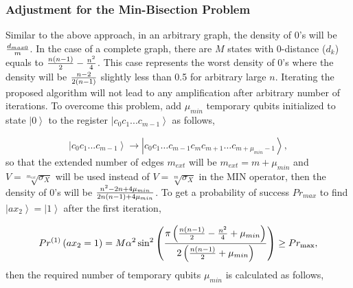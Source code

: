 \documentclass[a4paper]{article}
\begin{document}
\subsubsection*{Adjustment for the Min-Bisection Problem}


Similar to the above approach, in an arbitrary graph, the density of 0's will be ${\textstyle{{d_{max0} } \over m}}$. 
In the case of a complete graph, there are $M$ states with 0-distance ($d_k$) equals to 
${\textstyle{{n(n - 1)} \over 2}}-{\textstyle{{n^2} \over 4}}$. 
This case represents the worst density of 0's where the density will be ${\textstyle{{n-2 } \over {2(n - 1)}}}$ 
slightly less than 0.5 for arbitrary large $n$. Iterating the proposed algorithm will not lead to any amplification 
after arbitrary number of iterations. To overcome this problem, add $\mu_{min}$ temporary qubits initialized to 
state $\left|0 \right\rangle$ to the register $\left| {c_0 c_1 ...c_{m - 1} } \right\rangle$ as follows,

\begin{equation}
\left| {c_0 c_1 ...c_{m - 1} } \right\rangle \to \left| {c_0 c_1 \ldots c_{m - 1}c_{m}c_{m+1}\ldots c_{m+\mu_{min}-1} } \right\rangle,
\end{equation}
\noindent
so that the extended number of edges $m_{ext}$ will be $m_{ext}=m+\mu_{min}$ and $V=\sqrt[{m_{ext} }]{{\sigma _X }}$ 
will be used instead of $V=\sqrt[{m}]{{\sigma _X }}$ in the MIN operator, then the density of 0's will be 
${\textstyle{{n^2 -2n  + 4\mu _{min } } \over {2n(n - 1) + 4\mu _{min } }}}$. To get a probability of success $Pr_{max}$ 
to find $\left|ax_2 \right\rangle=\left|1 \right\rangle$ after the first iteration,

\begin{equation}
Pr ^{(1)} \left( {ax_2  = 1} \right) = M \alpha ^2 \sin ^2 \left( {\frac{{\pi \left( {{\textstyle{{n(n - 1)} \over 2}} - {\textstyle{{n^2 } \over 4}} + \mu _{min } } \right)}}{{2\left( {{\textstyle{{n(n - 1)} \over 2}} + \mu _{min } } \right)}}} \right) \ge Pr_{\max },
\end{equation}
\noindent
then the required number of temporary qubits $\mu_{min}$ is calculated as follows,
\end{document}
